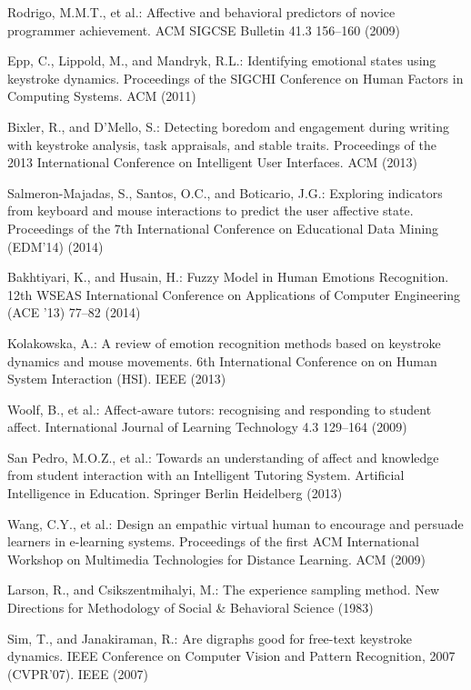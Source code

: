 \documentclass[runningheads,a4paper]{llncs}
\begin{document}
\begin{thebibliography}{4}
 Rodrigo, M.M.T., et al.: Affective and behavioral predictors of novice programmer achievement. ACM SIGCSE Bulletin 41.3 156--160 (2009)

 Epp, C., Lippold, M., and Mandryk, R.L.: Identifying emotional states using keystroke dynamics. Proceedings of the SIGCHI Conference on Human Factors in Computing Systems. ACM (2011)

 Bixler, R., and D'Mello, S.: Detecting boredom and engagement during writing with keystroke analysis, task appraisals, and stable traits. Proceedings of the 2013 International Conference on Intelligent User Interfaces. ACM (2013)

 Salmeron-Majadas, S., Santos, O.C., and Boticario, J.G.: Exploring indicators from keyboard and mouse interactions to predict the user affective state. Proceedings of the 7th International Conference on Educational Data Mining (EDM'14) (2014)

 Bakhtiyari, K., and Husain, H.: Fuzzy Model in Human Emotions Recognition. 12th WSEAS International Conference on Applications of Computer Engineering (ACE '13) 77--82 (2014)

 Kolakowska, A.: A review of emotion recognition methods based on keystroke dynamics and mouse movements. 6th International Conference on on Human System Interaction (HSI). IEEE (2013)
  
 Woolf, B., et al.: Affect-aware tutors: recognising and responding to student affect. International Journal of Learning Technology 4.3 129--164 (2009)
  
 San Pedro, M.O.Z., et al.: Towards an understanding of affect and knowledge from student interaction with an Intelligent Tutoring System. Artificial Intelligence in Education. Springer Berlin Heidelberg (2013)

 Wang, C.Y., et al.: Design an empathic virtual human to encourage and persuade learners in e-learning systems. Proceedings of the first ACM International Workshop on Multimedia Technologies for Distance Learning. ACM (2009)

 Larson, R., and Csikszentmihalyi, M.: The experience sampling method. New Directions for Methodology of Social & Behavioral Science (1983)

 Sim, T., and Janakiraman, R.: Are digraphs good for free-text keystroke dynamics. IEEE Conference on Computer Vision and Pattern Recognition, 2007 (CVPR'07). IEEE (2007)
  
\end{thebibliography}
\end{document}
